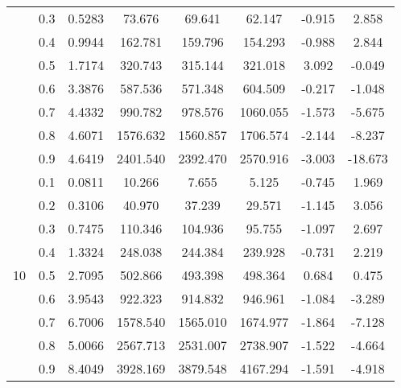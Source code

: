 \documentclass[11pt,a4paper]{report}
\begin{document}
\begin{longtable}{ | c | c || c | c | c | c | c | c | }
 & 0.3 & 0.5283 & 73.676 & 69.641 & 62.147 & -0.915 & 2.858 \\
 & 0.4 & 0.9944 & 162.781 & 159.796 & 154.293 & -0.988 & 2.844 \\
 & 0.5 & 1.7174 & 320.743 & 315.144 & 321.018 & 3.092 & -0.049 \\
 & 0.6 & 3.3876 & 587.536 & 571.348 & 604.509 & -0.217 & -1.048 \\
 & 0.7 & 4.4332 & 990.782 & 978.576 & 1060.055 & -1.573 & -5.675 \\
 & 0.8 & 4.6071 & 1576.632 & 1560.857 & 1706.574 & -2.144 & -8.237 \\
 & 0.9 & 4.6419 & 2401.540 & 2392.470 & 2570.916 & -3.003 & -18.673 \\
 \hline
\multirow{9}{*}{10} & 0.1 & 0.0811 & 10.266 & 7.655 & 5.125 & -0.745 & 1.969 \\
 & 0.2 & 0.3106 & 40.970 & 37.239 & 29.571 & -1.145 & 3.056 \\
 & 0.3 & 0.7475 & 110.346 & 104.936 & 95.755 & -1.097 & 2.697 \\
 & 0.4 & 1.3324 & 248.038 & 244.384 & 239.928 & -0.731 & 2.219 \\
 & 0.5 & 2.7095 & 502.866 & 493.398 & 498.364 & 0.684 & 0.475 \\
 & 0.6 & 3.9543 & 922.323 & 914.832 & 946.961 & -1.084 & -3.289 \\
 & 0.7 & 6.7006 & 1578.540 & 1565.010 & 1674.977 & -1.864 & -7.128 \\
 & 0.8 & 5.0066 & 2567.713 & 2531.007 & 2738.907 & -1.522 & -4.664 \\
 & 0.9 & 8.4049 & 3928.169 & 3879.548 & 4167.294 & -1.591 & -4.918 \\
 \hline
\hline
\end{longtable}
\end{document}
